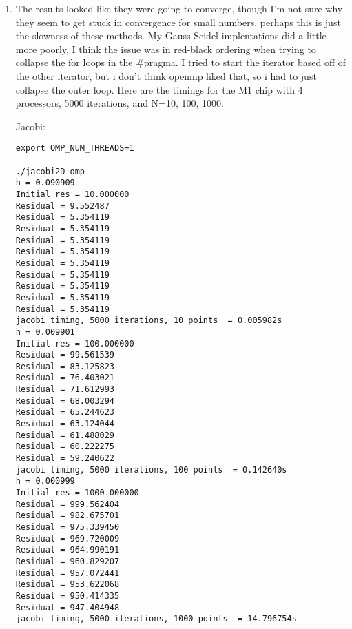 \documentclass{article}
\begin{document}
\begin{enumerate}
    \begin{verbatim}
export OMP_NUM_THREADS=1

./omp-scan
Final sum = 64818392
sequential-scan = 0.234070s
Final sum = 64818392
parallel-scan   = 0.373391s
error = 0

export OMP_NUM_THREADS=2

./omp-scan
Final sum = 64818392
sequential-scan = 0.267011s
Final sum = 64818392
parallel-scan   = 0.349630s
error = 53688865021493248

export OMP_NUM_THREADS=3

./omp-scan
Final sum = 64818392
sequential-scan = 0.223141s
Final sum = 1121116657
parallel-scan   = 0.342506s
error = 71587972667550439

export OMP_NUM_THREADS=4

./omp-scan
Final sum = 64818392
sequential-scan = 0.233759s
Final sum = 64818392
parallel-scan   = 0.289121s
error = 80536748538462208
    \end{verbatim}

    \item The results looked like they were going to converge, though I'm not sure why 
they seem to get stuck in convergence for small numbers, perhaps this is just the 
slowness of these methods.  My Gauss-Seidel implentations did a little more poorly, I 
think the issue was in red-black ordering when trying to collapse the for loops in the 
#pragma. I tried to start the iterator based off of the other iterator, but i don't 
think openmp liked that, so i had to just collapse the outer loop.  Here are the 
timings for the M1 chip with 4 processors, 5000 iterations, and N=10, 100, 1000.  

    Jacobi:
    \begin{verbatim}
export OMP_NUM_THREADS=1

./jacobi2D-omp
h = 0.090909
Initial res = 10.000000
Residual = 9.552487
Residual = 5.354119
Residual = 5.354119
Residual = 5.354119
Residual = 5.354119
Residual = 5.354119
Residual = 5.354119
Residual = 5.354119
Residual = 5.354119
Residual = 5.354119
jacobi timing, 5000 iterations, 10 points  = 0.005982s
h = 0.009901
Initial res = 100.000000
Residual = 99.561539
Residual = 83.125823
Residual = 76.403021
Residual = 71.612993
Residual = 68.003294
Residual = 65.244623
Residual = 63.124044
Residual = 61.488029
Residual = 60.222275
Residual = 59.240622
jacobi timing, 5000 iterations, 100 points  = 0.142640s
h = 0.000999
Initial res = 1000.000000
Residual = 999.562404
Residual = 982.675701
Residual = 975.339450
Residual = 969.720009
Residual = 964.990191
Residual = 960.829207
Residual = 957.072441
Residual = 953.622068
Residual = 950.414335
Residual = 947.404948
jacobi timing, 5000 iterations, 1000 points  = 14.796754s


\end{verbatim}
\end{enumerate}
\end{document}
